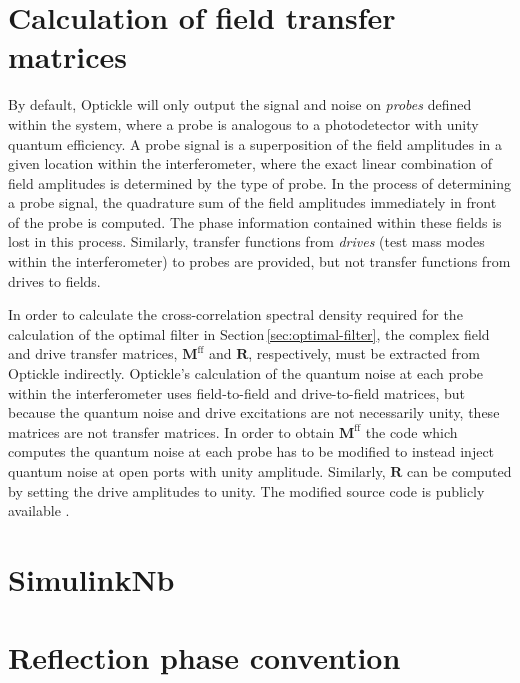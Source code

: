 \section{\label{sec:optickle-field-tfs}Calculation of field transfer matrices}
By default, Optickle will only output the signal and noise on \emph{probes} defined within the system, where a probe is analogous to a photodetector with unity quantum efficiency. A probe signal is a superposition of the field amplitudes in a given location within the interferometer, where the exact linear combination of field amplitudes is determined by the type of probe. In the process of determining a probe signal, the quadrature sum of the field amplitudes immediately in front of the probe is computed. The phase information contained within these fields is lost in this process. Similarly, transfer functions from \emph{drives} (test mass modes within the interferometer) to probes are provided, but not transfer functions from drives to fields.

In order to calculate the cross-correlation spectral density required for the calculation of the optimal filter in Section\,\ref{sec:optimal-filter}, the complex field and drive transfer matrices, $\mathbf{M}^{\textrm{ff}}$ and $\mathbf{R}$, respectively, must be extracted from Optickle indirectly. Optickle's calculation of the quantum noise at each probe within the interferometer uses field-to-field and drive-to-field matrices, but because the quantum noise and drive excitations are not necessarily unity, these matrices are not transfer matrices. In order to obtain $\mathbf{M}^{\textrm{ff}}$ the code which computes the quantum noise at each probe has to be modified to instead inject quantum noise at open ports with unity amplitude. Similarly, $\mathbf{R}$ can be computed by setting the drive amplitudes to unity. The modified source code is publicly available \cite{controlspaperdata}.

\section{\label{sec:simulinknb-sim}SimulinkNb}
\cite{SimulinkNb}

\section{Reflection phase convention}
\label{a:reflection-phase}
